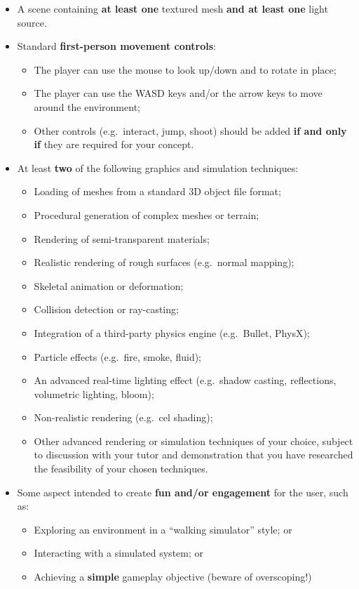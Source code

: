 \documentclass{../../fal_assignment}
\begin{document}
\begin{itemize}
	\item A scene containing \textbf{at least one} textured mesh \textbf{and at least one} light source.
	\item Standard \textbf{first-person movement controls}:
		\begin{itemize}
			\item The player can use the mouse to look up/down and to rotate in place;
			\item The player can use the WASD keys and/or the arrow keys to move around the environment;
			\item Other controls (e.g.\ interact, jump, shoot) should be added
				\textbf{if and only if} they are required for your concept.
		\end{itemize}
	\item At least \textbf{two} of the following graphics and simulation techniques:
		\begin{itemize}
			\item Loading of meshes from a standard 3D object file format;
			\item Procedural generation of complex meshes or terrain;
			\item Rendering of semi-transparent materials;
			\item Realistic rendering of rough surfaces (e.g.\ normal mapping);
			\item Skeletal animation or deformation;
			\item Collision detection or ray-casting;
			\item Integration of a third-party physics engine (e.g.\ Bullet, PhysX);
			\item Particle effects (e.g.\ fire, smoke, fluid);
			\item An advanced real-time lighting effect (e.g.\ shadow casting, reflections, volumetric lighting, bloom);
			\item Non-realistic rendering (e.g.\ cel shading);
			\item Other advanced rendering or simulation techniques of your choice,
				subject to discussion with your tutor
				and demonstration that you have researched the feasibility of your chosen techniques.
		\end{itemize}
	\item Some aspect intended to create \textbf{fun and/or engagement} for the user,
		such as:
		\begin{itemize}
			\item Exploring an environment in a ``walking simulator'' style; or
			\item Interacting with a simulated system; or
			\item Achieving a \textbf{simple} gameplay objective (beware of overscoping!)
		\end{itemize}
\end{itemize}
\end{document}
